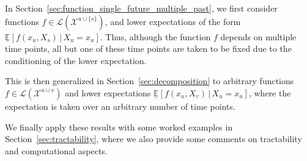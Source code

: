 \documentclass[10pt,a4paper]{paper}
\theoremstyle{definition}
\newcommand{\states}{\mathcal{X}}
\newcommand{\gambles}{\mathcal{L}}
\begin{document}
In Section~\ref{sec:function_single_future_multiple_past}, we first consider functions $f\in\gambles(\states^{u\cup\{s\}})$, and lower expectations of the form $\underline{\mathbb{E}}[f(x_u,X_s)\,\vert\,X_u=x_u]$. Thus, although the function $f$ depends on multiple time points, all but one of these time points are taken to be fixed due to the conditioning of the lower expectation.

This is then generalized in Section~\ref{sec:decomposition} to arbitrary functions $f\in\gambles(\states^{u\cup v})$ and lower expectations $\underline{\mathbb{E}}[f(x_u,X_v)\,\vert\,X_u=x_u]$, where the expectation is taken over an arbitrary number of time points.

We finally apply these results with some worked examples in Section~\ref{sec:tractability}, where we also provide some comments on tractability and computational aspects.

%
%
\end{document}
